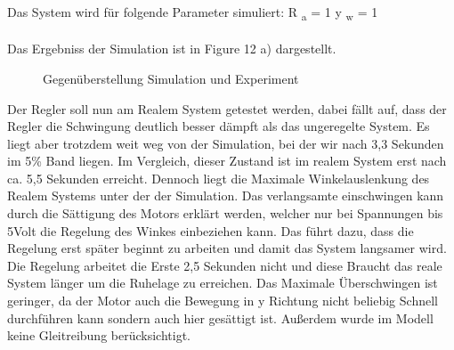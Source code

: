 \documentclass[10pt]{scrartcl}
\begin{document}
\\Das System wird für folgende Parameter simuliert:
R \textsubscript{a} = 1
 y \textsubscript{w} = 1\\
\\Das Ergebniss der Simulation ist in Figure 12 a) dargestellt. 
\begin{figure} [H]
\caption{ Gegenüberstellung Simulation und Experiment} 
\end{figure}
Der Regler soll nun am Realem System getestet werden, dabei fällt auf, dass
der Regler die Schwingung deutlich besser  dämpft  als das ungeregelte System. Es liegt aber trotzdem weit weg von der Simulation, bei der wir nach 3,3 Sekunden im 5\% Band liegen. Im Vergleich, dieser Zustand ist im realem System erst nach ca. 5,5 Sekunden erreicht. Dennoch liegt die Maximale Winkelauslenkung des Realem Systems unter der der Simulation. Das verlangsamte einschwingen kann durch die Sättigung des Motors erklärt werden, welcher nur bei Spannungen bis 5Volt die Regelung des Winkes einbeziehen kann. Das führt dazu, dass die Regelung erst später beginnt zu arbeiten und damit das System langsamer wird. Die Regelung arbeitet die Erste 2,5 Sekunden nicht und diese Braucht das reale System länger um die Ruhelage zu erreichen. Das Maximale Überschwingen ist geringer, da der Motor auch die Bewegung in y Richtung nicht beliebig Schnell durchführen kann sondern auch hier gesättigt ist. Außerdem wurde im Modell keine Gleitreibung berücksichtigt.\\
\end{document}
